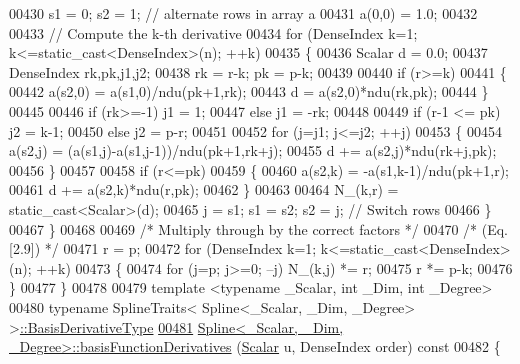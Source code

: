 \begin{DoxyCode}
00430       s1 = 0; s2 = 1; \textcolor{comment}{// alternate rows in array a}
00431       a(0,0) = 1.0;
00432 
00433       \textcolor{comment}{// Compute the k-th derivative}
00434       \textcolor{keywordflow}{for} (DenseIndex k=1; k<=static\_cast<DenseIndex>(n); ++k)
00435       \{
00436         Scalar d = 0.0;
00437         DenseIndex rk,pk,j1,j2;
00438         rk = r-k; pk = p-k;
00439 
00440         \textcolor{keywordflow}{if} (r>=k)
00441         \{
00442           a(s2,0) = a(s1,0)/ndu(pk+1,rk);
00443           d = a(s2,0)*ndu(rk,pk);
00444         \}
00445 
00446         \textcolor{keywordflow}{if} (rk>=-1) j1 = 1;
00447         \textcolor{keywordflow}{else}        j1 = -rk;
00448 
00449         \textcolor{keywordflow}{if} (r-1 <= pk) j2 = k-1;
00450         \textcolor{keywordflow}{else}           j2 = p-r;
00451 
00452         \textcolor{keywordflow}{for} (j=j1; j<=j2; ++j)
00453         \{
00454           a(s2,j) = (a(s1,j)-a(s1,j-1))/ndu(pk+1,rk+j);
00455           d += a(s2,j)*ndu(rk+j,pk);
00456         \}
00457 
00458         \textcolor{keywordflow}{if} (r<=pk)
00459         \{
00460           a(s2,k) = -a(s1,k-1)/ndu(pk+1,r);
00461           d += a(s2,k)*ndu(r,pk);
00462         \}
00463 
00464         N\_(k,r) = \textcolor{keyword}{static\_cast<}Scalar\textcolor{keyword}{>}(d);
00465         j = s1; s1 = s2; s2 = j; \textcolor{comment}{// Switch rows}
00466       \}
00467     \}
00468 
00469     \textcolor{comment}{/* Multiply through by the correct factors */}
00470     \textcolor{comment}{/* (Eq. [2.9])                             */}
00471     r = p;
00472     \textcolor{keywordflow}{for} (DenseIndex k=1; k<=static\_cast<DenseIndex>(n); ++k)
00473     \{
00474       \textcolor{keywordflow}{for} (j=p; j>=0; --j) N\_(k,j) *= r;
00475       r *= p-k;
00476     \}
00477   \}
00478 
00479   \textcolor{keyword}{template} <\textcolor{keyword}{typename} \_Scalar, \textcolor{keywordtype}{int} \_Dim, \textcolor{keywordtype}{int} \_Degree>
00480   \textcolor{keyword}{typename} SplineTraits< Spline<\_Scalar, \_Dim, \_Degree> >\hyperlink{group___splines___module_a9db0b0108353660cd03524f2e67d6b3c}{::BasisDerivativeType}
\hyperlink{group___splines___module_a17d416e814d1ee957e5b309dc423751f}{00481}     \hyperlink{group___splines___module_a17d416e814d1ee957e5b309dc423751f}{Spline<\_Scalar, \_Dim, \_Degree>::basisFunctionDerivatives}
      (\hyperlink{group___splines___module_a8cafd78b564825c76fbb3419653d9742}{Scalar} u, DenseIndex order)\textcolor{keyword}{ const}
00482 \textcolor{keyword}{  }\{

\end{DoxyCode}
